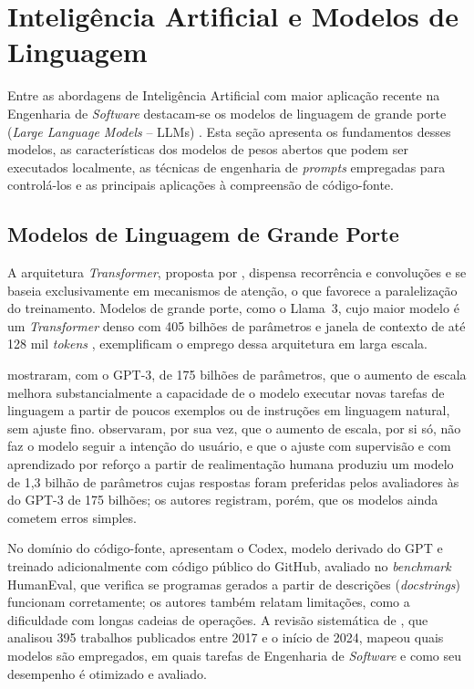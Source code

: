 \documentclass[
    12pt,                   %
    openright,              %
    oneside,                %
    a4paper,                %
    sumario=tradicional,    %
    english,                %
    brazil,                 %
    ]{abntex2}
\begin{document}
\section{Inteligência Artificial e Modelos de Linguagem}\label{sec:IA}

Entre as abordagens de Inteligência Artificial com maior aplicação recente na Engenharia de \textit{Software} destacam-se os modelos de linguagem de grande porte (\textit{Large Language Models} -- LLMs) \cite{hou2024llmse}. Esta seção apresenta os fundamentos desses modelos, as características dos modelos de pesos abertos que podem ser executados localmente, as técnicas de engenharia de \textit{prompts} empregadas para controlá-los e as principais aplicações à compreensão de código-fonte.

\subsection{Modelos de Linguagem de Grande Porte}\label{sec:LLM}

A arquitetura \textit{Transformer}, proposta por \textcite{vaswani2017attention}, dispensa recorrência e convoluções e se baseia exclusivamente em mecanismos de atenção, o que favorece a paralelização do treinamento. Modelos de grande porte, como o Llama~3, cujo maior modelo é um \textit{Transformer} denso com 405 bilhões de parâmetros e janela de contexto de até 128 mil \textit{tokens} \cite{grattafiori2024llama3}, exemplificam o emprego dessa arquitetura em larga escala.

\textcite{brown2020fewshot} mostraram, com o GPT-3, de 175 bilhões de parâmetros, que o aumento de escala melhora substancialmente a capacidade de o modelo executar novas tarefas de linguagem a partir de poucos exemplos ou de instruções em linguagem natural, sem ajuste fino. \textcite{ouyang2022instructions} observaram, por sua vez, que o aumento de escala, por si só, não faz o modelo seguir a intenção do usuário, e que o ajuste com supervisão e com aprendizado por reforço a partir de realimentação humana produziu um modelo de 1,3 bilhão de parâmetros cujas respostas foram preferidas pelos avaliadores às do GPT-3 de 175 bilhões; os autores registram, porém, que os modelos ainda cometem erros simples.

No domínio do código-fonte, \textcite{chen2021codex} apresentam o Codex, modelo derivado do GPT e treinado adicionalmente com código público do GitHub, avaliado no \textit{benchmark} HumanEval, que verifica se programas gerados a partir de descrições (\textit{docstrings}) funcionam corretamente; os autores também relatam limitações, como a dificuldade com longas cadeias de operações. A revisão sistemática de \textcite{hou2024llmse}, que analisou 395 trabalhos publicados entre 2017 e o início de 2024, mapeou quais modelos são empregados, em quais tarefas de Engenharia de \textit{Software} e como seu desempenho é otimizado e avaliado.
\end{document}
